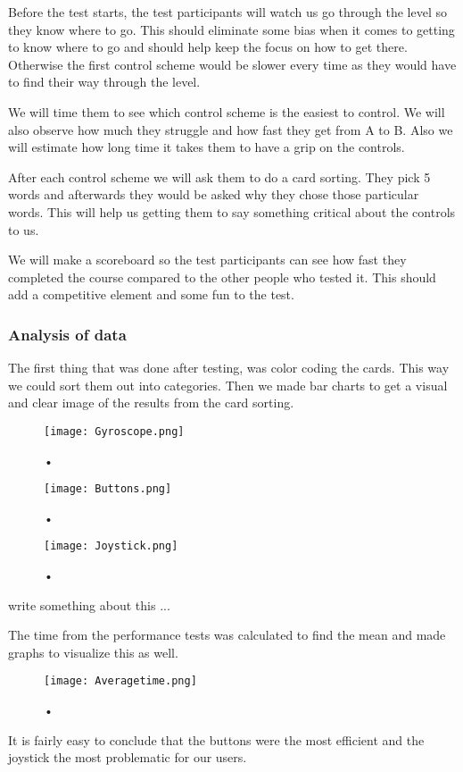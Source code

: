 Before the test starts, the test participants will watch us go through the level so they know where to go. This should eliminate some bias when it comes to getting to know where to go and should help keep the focus on how to get there. Otherwise the first control scheme would be slower every time as they would have to find their way through the level.

We will time them to see which control scheme is the easiest to control. We will also observe how much they struggle and how fast they get from A to B. Also we will estimate how long time it takes them to have a grip on the controls.

After each control scheme we will ask them to do a card sorting. They pick 5 words and afterwards they would be asked why they chose those particular words. This will help us getting them to say something critical about the controls to us. 

We will make a scoreboard so the test participants can see how fast they completed the course compared to the other people who tested it.
This should add a competitive element and some fun to the test.

\subsubsection{Analysis of data}

The first thing that was done after testing, was color coding the cards. This way we could sort them out into categories. 
Then we made bar charts to get a visual and clear image of the results from the card sorting.

\begin{figure}[H]
\centering
\texttt{[image: Gyroscope.png]}
\caption{•}
\end{figure}

\begin{figure}[H]
\centering
\texttt{[image: Buttons.png]}
\caption{•}
\end{figure}

\begin{figure}[H]
\centering
\texttt{[image: Joystick.png]}
\caption{•}
\end{figure}

write something about this ...

The time from the performance tests was calculated to find the mean and made graphs to visualize this as well. 

\begin{figure}[H]
\centering
\texttt{[image: Averagetime.png]}
\caption{•}
\end{figure}

It is fairly easy to conclude that the buttons were the most efficient and the joystick the most problematic for our users. 



